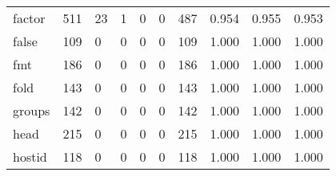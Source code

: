 \begin{longtable}{lp{2.0cm}p{2.0cm}p{2.0cm}p{2.0cm}p{2.0cm}p{2.0cm}p{2.0cm}p{2.0cm}p{2.0cm}}
factor    &                    511 &                                 23 &                                 1 &                                0 &                                 0 &                             487 &                                   0.954 &                                  0.955 &                                0.953 \\
false     &                    109 &                                  0 &                                 0 &                                0 &                                 0 &                             109 &                                   1.000 &                                  1.000 &                                1.000 \\
fmt       &                    186 &                                  0 &                                 0 &                                0 &                                 0 &                             186 &                                   1.000 &                                  1.000 &                                1.000 \\
fold      &                    143 &                                  0 &                                 0 &                                0 &                                 0 &                             143 &                                   1.000 &                                  1.000 &                                1.000 \\
groups    &                    142 &                                  0 &                                 0 &                                0 &                                 0 &                             142 &                                   1.000 &                                  1.000 &                                1.000 \\
head      &                    215 &                                  0 &                                 0 &                                0 &                                 0 &                             215 &                                   1.000 &                                  1.000 &                                1.000 \\
hostid    &                    118 &                                  0 &                                 0 &                                0 &                                 0 &                             118 &                                   1.000 &                                  1.000 &                                1.000 \\

\end{longtable}
